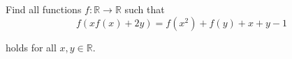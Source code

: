 Find all functions $ f : \mathbb{R} \rightarrow \mathbb{R} $ such that\[ f( xf(x) + 2y) = f(x^2)+f(y)+x+y-1 \]

holds for all $ x, y \in \mathbb{R}$.